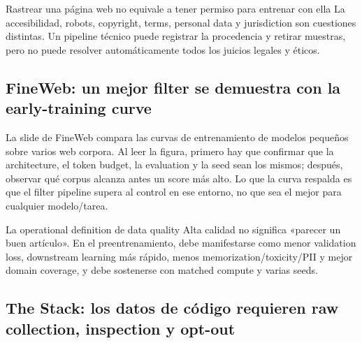
\begin{warningbox}{Rastrear una página web no equivale a tener permiso para entrenar con ella}
La accesibilidad, robots, copyright, terms, personal data y jurisdiction son cuestiones distintas. Un pipeline técnico puede registrar la procedencia y retirar muestras, pero no puede resolver automáticamente todos los juicios legales y éticos.
\end{warningbox}


\subsection{FineWeb: un mejor filter se demuestra con la early-training curve}

La slide de FineWeb compara las curvas de entrenamiento de modelos pequeños sobre varios web corpora. Al leer la figura, primero hay que confirmar que la architecture, el token budget, la evaluation y la seed sean los mismos; después, observar qué corpus alcanza antes un score más alto. Lo que la curva respalda es que el filter pipeline supera al control en ese entorno, no que sea el mejor para cualquier modelo/tarea.


\begin{importantbox}{La operational definition de data quality}
Alta calidad no significa «parecer un buen artículo». En el preentrenamiento, debe manifestarse como menor validation loss, downstream learning más rápido, menos memorization/toxicity/PII y mejor domain coverage, y debe sostenerse con matched compute y varias seeds.
\end{importantbox}

\subsection{The Stack: los datos de código requieren raw collection, inspection y opt-out}

